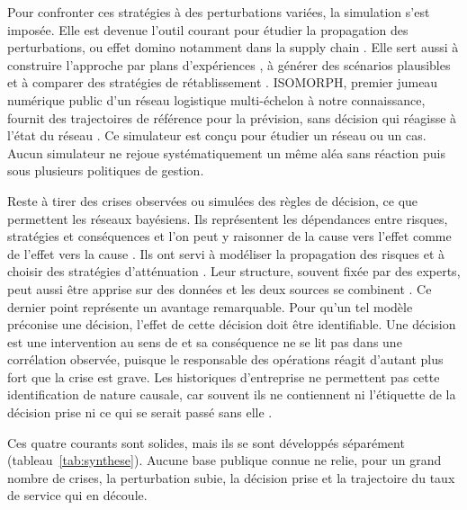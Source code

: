 Pour confronter ces stratégies à des perturbations variées, la simulation s'est imposée. Elle est devenue l'outil courant pour étudier la propagation des perturbations, ou effet domino notamment dans la supply chain \citep{schmitt2012, ivanov2017}. Elle sert aussi à construire l'approche par plans d'expériences \citep{macdonald2018}, à générer des scénarios plausibles \citep{klibi2012ejor} et à comparer des stratégies de rétablissement \citep{ramzy2022}. ISOMORPH, premier jumeau numérique public d'un réseau logistique multi-échelon à notre connaissance, fournit des trajectoires de référence pour la prévision, sans décision qui réagisse à l'état du réseau \citep{zhang2026isomorph}. Ce simulateur est conçu pour étudier un réseau ou un cas. Aucun simulateur ne rejoue systématiquement un même aléa sans réaction puis sous plusieurs politiques de gestion.

Reste à tirer des crises observées ou simulées des règles de décision, ce que permettent les réseaux bayésiens. Ils représentent les dépendances entre risques, stratégies et conséquences et l'on peut y raisonner de la cause vers l'effet comme de l'effet vers la cause \citep{hosseiniivanov2020}. Ils ont servi à modéliser la propagation des risques \citep{garvey2015, ojha2018} et à choisir des stratégies d'atténuation \citep{qazi2018}. Leur structure, souvent fixée par des experts, peut aussi être apprise sur des données et les deux sources se combinent \citep{heckerman1995}. Ce dernier point représente un avantage remarquable. Pour qu'un tel modèle préconise une décision, l'effet de cette décision doit être identifiable. Une décision est une intervention au sens de \citet{pearl2009} et sa conséquence ne se lit pas dans une corrélation observée, puisque le responsable des opérations réagit d'autant plus fort que la crise est grave. Les historiques d'entreprise ne permettent pas cette identification de nature causale, car souvent ils ne contiennent ni l'étiquette de la décision prise ni ce qui se serait passé sans elle \citep{do2024}.

Ces quatre courants sont solides, mais ils se sont développés séparément (tableau~\ref{tab:synthese}). Aucune base publique connue ne relie, pour un grand nombre de crises, la perturbation subie, la décision prise et la trajectoire du taux de service qui en découle.

